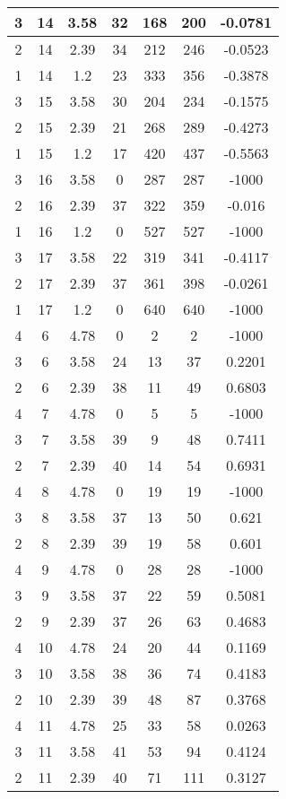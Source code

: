 \documentclass[letterpaper, 12pt]{article}
\begin{document}
\begin{longtable}{|c|c|c|c|c|c|c|}
\hline
3 & 14 & 3.58 & 32 & 168 & 200 & -0.0781 \\
\hline
2 & 14 & 2.39 & 34 & 212 & 246 & -0.0523 \\
\hline
1 & 14 & 1.2 & 23 & 333 & 356 & -0.3878 \\
\hline
3 & 15 & 3.58 & 30 & 204 & 234 & -0.1575 \\
\hline
2 & 15 & 2.39 & 21 & 268 & 289 & -0.4273 \\
\hline
1 & 15 & 1.2 & 17 & 420 & 437 & -0.5563 \\
\hline
3 & 16 & 3.58 & 0 & 287 & 287 & -1000 \\
\hline
2 & 16 & 2.39 & 37 & 322 & 359 & -0.016 \\
\hline
1 & 16 & 1.2 & 0 & 527 & 527 & -1000 \\
\hline
3 & 17 & 3.58 & 22 & 319 & 341 & -0.4117 \\
\hline
2 & 17 & 2.39 & 37 & 361 & 398 & -0.0261 \\
\hline
1 & 17 & 1.2 & 0 & 640 & 640 & -1000 \\
\hline
4 & 6 & 4.78 & 0 & 2 & 2 & -1000 \\
\hline
3 & 6 & 3.58 & 24 & 13 & 37 & 0.2201 \\
\hline
2 & 6 & 2.39 & 38 & 11 & 49 & 0.6803 \\
\hline
4 & 7 & 4.78 & 0 & 5 & 5 & -1000 \\
\hline
3 & 7 & 3.58 & 39 & 9 & 48 & 0.7411 \\
\hline
2 & 7 & 2.39 & 40 & 14 & 54 & 0.6931 \\
\hline
4 & 8 & 4.78 & 0 & 19 & 19 & -1000 \\
\hline
3 & 8 & 3.58 & 37 & 13 & 50 & 0.621 \\
\hline
2 & 8 & 2.39 & 39 & 19 & 58 & 0.601 \\
\hline
4 & 9 & 4.78 & 0 & 28 & 28 & -1000 \\
\hline
3 & 9 & 3.58 & 37 & 22 & 59 & 0.5081 \\
\hline
2 & 9 & 2.39 & 37 & 26 & 63 & 0.4683 \\
\hline
4 & 10 & 4.78 & 24 & 20 & 44 & 0.1169 \\
\hline
3 & 10 & 3.58 & 38 & 36 & 74 & 0.4183 \\
\hline
2 & 10 & 2.39 & 39 & 48 & 87 & 0.3768 \\
\hline
4 & 11 & 4.78 & 25 & 33 & 58 & 0.0263 \\
\hline
3 & 11 & 3.58 & 41 & 53 & 94 & 0.4124 \\
\hline
2 & 11 & 2.39 & 40 & 71 & 111 & 0.3127 \\

\end{longtable}
\end{document}
